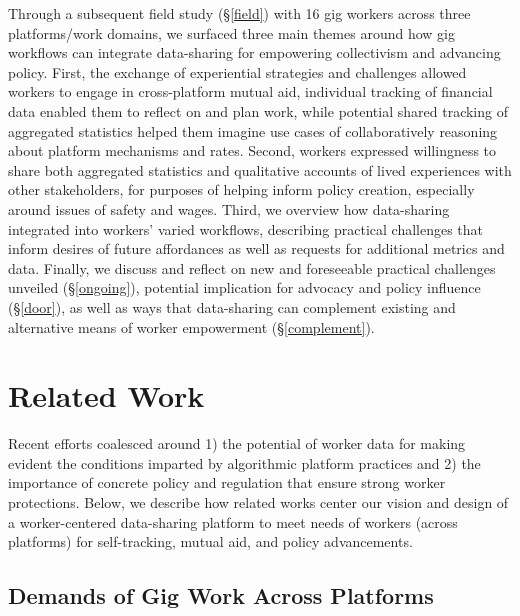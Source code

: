 Through a subsequent field study {(\S\ref{field})} with 16 gig workers across three platforms/work domains, we {surfaced three main themes around how gig workflows can integrate data-sharing for empowering collectivism and advancing policy.} 
{First, the exchange of experiential strategies and challenges allowed workers to engage in cross-platform mutual aid, 
individual tracking of financial data enabled them to reflect on and plan work,
while potential shared tracking of  aggregated statistics helped them imagine use cases of collaboratively reasoning about platform mechanisms and rates. Second, workers expressed willingness to share both aggregated statistics and qualitative accounts of lived experiences with other stakeholders, for purposes of helping inform policy creation, especially around issues of safety and wages. Third, we overview how data-sharing integrated into workers' varied workflows, describing practical challenges that inform desires of future affordances as well as requests for additional metrics and data.}
Finally, we discuss and reflect on {new and foreseeable practical challenges unveiled (\S\ref{ongoing})}, potential implication for {advocacy and policy influence (\S\ref{door}), as well as ways that data-sharing can complement existing and alternative means of worker empowerment (\S\ref{complement})}.

\section{Related Work}\label{Related_Work}
{Recent efforts} coalesced around 1) the potential of worker data for making evident the conditions imparted by algorithmic platform practices and 2) the importance of concrete policy and regulation that ensure strong worker protections. 
Below, we describe how related works center our vision {and design} of a worker-centered data-sharing platform to meet {needs of workers (across platforms)} for self-tracking, mutual aid, and policy advancements.

\subsection{{Demands of Gig Work Across Platforms}}\label{Related_Work_Challenges}

